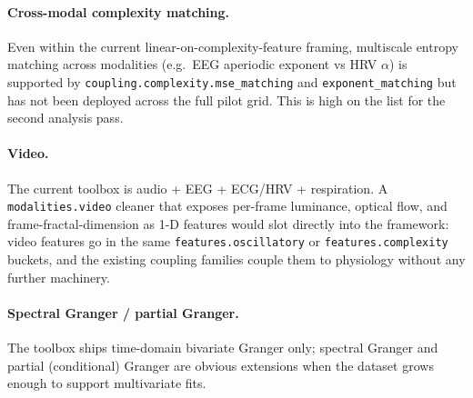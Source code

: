 \documentclass[11pt,a4paper]{article}
\begin{document}
\paragraph{Cross-modal complexity matching.} Even within the current
linear-on-complexity-feature framing, multiscale entropy matching
across modalities (e.g.\ EEG aperiodic exponent vs HRV $\alpha$) is
supported by \texttt{coupling.complexity.mse\_matching} and
\texttt{exponent\_matching} but has not been deployed across the full
pilot grid. This is high on the list for the second analysis pass.

\paragraph{Video.} The current toolbox is audio + EEG + ECG/HRV +
respiration. A \texttt{modalities.video} cleaner that exposes per-frame
luminance, optical flow, and frame-fractal-dimension as 1-D features
would slot directly into the framework: video features go in the same
\texttt{features.oscillatory} or \texttt{features.complexity} buckets,
and the existing coupling families couple them to physiology without
any further machinery.

\paragraph{Spectral Granger / partial Granger.} The toolbox ships
time-domain bivariate Granger only; spectral Granger and partial
(conditional) Granger are obvious extensions when the dataset grows
enough to support multivariate fits.
\end{document}
